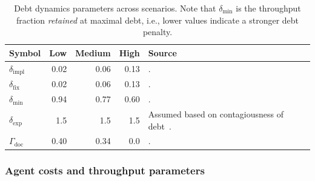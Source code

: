 \documentclass[smallextended]{svjour3}       %
\begin{document}
\begin{table}[t]
\caption{Debt dynamics parameters across scenarios. Note that $\delta_\mathrm{min}$ is the throughput fraction \emph{retained} at maximal debt, i.e., lower values indicate a stronger debt penalty.}
\label{tab:scenario:debt}
\footnotesize
\begin{tabularx}{\linewidth}{p{1.8cm}rrrX}
\toprule
Symbol & Low & Medium & High & Source \\
\midrule
$\delta_\mathrm{impl}$ & 0.02 & 0.06 & 0.13 & \cite{he2026cursordebt}. \\[2pt]
$\delta_\mathrm{fix}$  & 0.02 & 0.06 & 0.13 & \cite{he2026cursordebt}. \\[2pt]
$\delta_\mathrm{min}$  & 0.94  & 0.77  & 0.60  & \cite{besker2018technical}. \\[2pt]
$\delta_\mathrm{exp}$  & 1.5   & 1.5   & 1.5   & Assumed based on contagiousness of debt~\citep{martini2017interest}. \\[2pt]
$\Gamma_\mathrm{doc}$  & 0.40  & 0.34  & 0.0  & \cite{dzidek2008uml, abdelsalam2026comments}. \\
\bottomrule
\end{tabularx}
\end{table}

\subsubsection{Agent costs and throughput parameters}
\label{sec:scenario:agentcosts}
\end{document}
